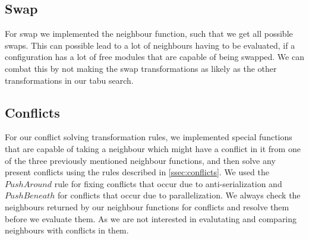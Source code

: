 \subsection{Swap}
For swap we implemented the neighbour function, such that we get all possible swaps. This can possible lead to a lot of neighbours having to be evaluated, if a configuration has a lot of free modules that are capable of being swapped. We can combat this by not making the swap transformations as likely as the other transformations in our tabu search.

\subsection{Conflicts} 
For our conflict solving transformation rules, we implemented special functions that are capable of taking a neighbour which might have a conflict in it from one of the three previously mentioned neighbour functions, and then solve any present conflicts using the rules described in \cref{ssec:conflicts}. We used the $Push Around$ rule for fixing conflicts that occur due to anti-serialization and $Push Beneath$ for conflicts that occur due to parallelization.
 We always check the neighbours returned by our neighbour functions for conflicts and resolve them before we evaluate them. As we are not interested in evalutating and comparing neighbours with conflicts in them.

